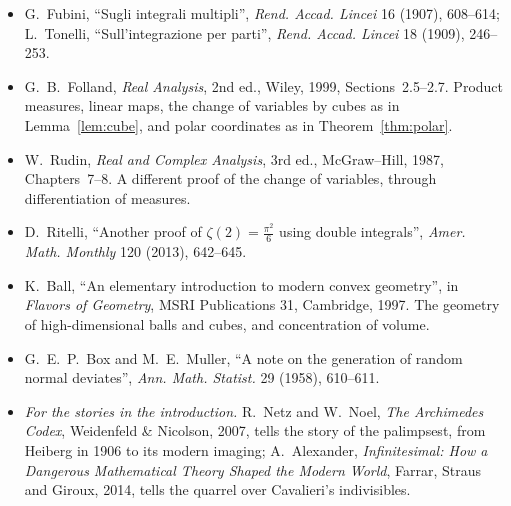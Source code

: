 \begin{itemize}
\item G.~Fubini, ``Sugli integrali multipli'', \emph{Rend. Accad. Lincei} 16 (1907), 608--614; L.~Tonelli, ``Sull'integrazione per parti'', \emph{Rend. Accad. Lincei} 18 (1909), 246--253.
\item G.~B.~Folland, \emph{Real Analysis}, 2nd ed., Wiley, 1999, Sections~2.5--2.7. Product measures, linear maps, the change of variables by cubes as in Lemma~\ref{lem:cube}, and polar coordinates as in
Theorem~\ref{thm:polar}.
\item W.~Rudin, \emph{Real and Complex Analysis}, 3rd ed., McGraw--Hill, 1987, Chapters~7--8. A different proof of the change of variables, through differentiation of measures.
\item D.~Ritelli, ``Another proof of $\zeta(2)=\frac{\pi^2}6$ using double integrals'', \emph{Amer. Math. Monthly} 120 (2013), 642--645.
\item K.~Ball, ``An elementary introduction to modern convex geometry'', in \emph{Flavors of Geometry}, MSRI Publications 31, Cambridge, 1997. The geometry of high-dimensional balls and cubes,
and concentration of volume.
\item G.~E.~P.~Box and M.~E.~Muller, ``A note on the generation of random normal deviates'', \emph{Ann. Math. Statist.} 29 (1958), 610--611.
\item \emph{For the stories in the introduction.} R.~Netz and W.~Noel, \emph{The Archimedes Codex}, Weidenfeld \& Nicolson, 2007, tells the story of the palimpsest, from Heiberg in
1906 to its modern imaging; A.~Alexander, \emph{Infinitesimal: How a Dangerous Mathematical Theory Shaped the Modern World}, Farrar, Straus and Giroux, 2014, tells the
quarrel over Cavalieri's indivisibles.
\end{itemize}
